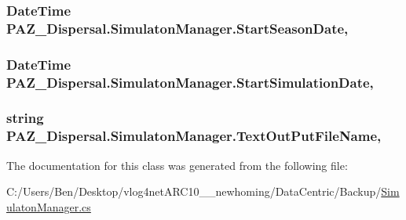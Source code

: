 \hypertarget{class_p_a_z___dispersal_1_1_simulaton_manager_abd1c16b30088278e3e388b624603331b}{
\subsubsection[{Start\-Season\-Date}]{\setlength{\rightskip}{0pt plus 5cm}Date\-Time P\-A\-Z\-\_\-\-Dispersal.\-Simulaton\-Manager.\-Start\-Season\-Date\hspace{0.3cm}{\ttfamily [get]}, {\ttfamily [set]}}}\label{class_p_a_z___dispersal_1_1_simulaton_manager_abd1c16b30088278e3e388b624603331b}
\hypertarget{class_p_a_z___dispersal_1_1_simulaton_manager_a704c71c91f39ebae5fcb7832afec0ce3}{
\subsubsection[{Start\-Simulation\-Date}]{\setlength{\rightskip}{0pt plus 5cm}Date\-Time P\-A\-Z\-\_\-\-Dispersal.\-Simulaton\-Manager.\-Start\-Simulation\-Date\hspace{0.3cm}{\ttfamily [get]}, {\ttfamily [set]}}}\label{class_p_a_z___dispersal_1_1_simulaton_manager_a704c71c91f39ebae5fcb7832afec0ce3}
\hypertarget{class_p_a_z___dispersal_1_1_simulaton_manager_ac99cb22bafc101d81d55584b8dc6173b}{
\subsubsection[{Text\-Out\-Put\-File\-Name}]{\setlength{\rightskip}{0pt plus 5cm}string P\-A\-Z\-\_\-\-Dispersal.\-Simulaton\-Manager.\-Text\-Out\-Put\-File\-Name\hspace{0.3cm}{\ttfamily [get]}, {\ttfamily [set]}}}\label{class_p_a_z___dispersal_1_1_simulaton_manager_ac99cb22bafc101d81d55584b8dc6173b}


The documentation for this class was generated from the following file\-:\begin{DoxyCompactItemize}
\item 
C\-:/\-Users/\-Ben/\-Desktop/vlog4net\-A\-R\-C10\-\_\-\_\-newhoming/\-Data\-Centric/\-Backup/\hyperlink{_backup_2_simulaton_manager_8cs}{Simulaton\-Manager.\-cs}\end{DoxyCompactItemize}
